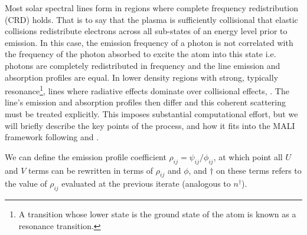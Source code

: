 Most solar spectral lines form in regions where complete frequency redistribution (CRD) holds.
That is to say that the plasma is sufficiently collisional that elastic collisions redistribute electrons across all sub-states of an energy level prior to emission.
In this case, the emission frequency of a photon is not correlated with the frequency of the photon absorbed to excite the atom into this state i.e. photons are completely redistributed in frequency and the line emission and absorption profiles are equal.
In lower density regions with strong, typically resonance\footnote{A transition whose lower state is the ground state of the atom is known as a resonance transition.}, lines where radiative effects dominate over collisional effects,
\citep{Hubeny2014}.
The line's emission and absorption profiles then differ and this coherent scattering must be treated explicitly.
This imposes substantial computational effort, but we will briefly describe the key points of the process, and how it fits into the MALI framework following \citet{Uitenbroek2001} and \citet{Hubeny2014}.

We can define the emission profile coefficient $\rho_{ij} = \psi_{ij} / \phi_{ij}$, at which point all $U$ and $V$ terms can be rewritten in terms of $\rho_{ij}$ and $\phi$, and $\dagger$ on these terms refers to the value of $\rho_{ij}$ evaluated at the previous iterate (analogous to $n^\dagger$).

